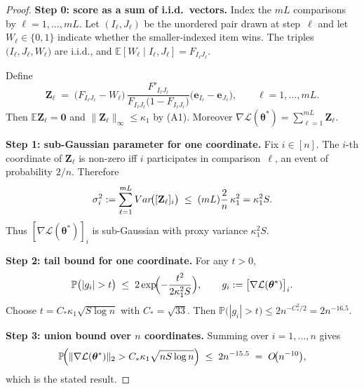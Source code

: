 \documentclass[10pt,a4paper]{amsart}
\def\E{\mathbb{E}}
\def\Var{{\rm Var}}
\def\bth{{\boldsymbol{\theta}}}
\newcommand{\Pro}{\mathbb{P}}
\begin{document}
\begin{proof}
	\textbf{Step 0: score as a sum of i.i.d.\ vectors.}
	Index the $mL$ comparisons by $\ell=1,\dots ,mL$.  Let
	\((I_\ell,J_\ell)\) be the unordered pair drawn at step~$\ell$ and let
	\(W_\ell\in\{0,1\}\) indicate whether the smaller-indexed item wins.
	The triples
	\(\bigl(I_\ell,J_\ell,W_\ell\bigr)\) are i.i.d., and
	\(\E[W_\ell\mid I_\ell,J_\ell]=F_{I_\ell J_\ell}\).
	
	Define
	\[
	\mathbf Z_\ell
	\;=\;
	\bigl(F_{I_\ell J_\ell}-W_\ell\bigr)\,
	\frac{F'_{I_\ell J_\ell}}{F_{I_\ell J_\ell}\bigl(1-F_{I_\ell J_\ell}\bigr)}
	\bigl(\mathbf e_{I_\ell}-\mathbf e_{J_\ell}\bigr),
	\qquad
	\ell=1,\dots,mL .
	\]
	Then \(\E\mathbf Z_\ell=\mathbf 0\) and
	\(\|\mathbf Z_\ell\|_{\infty}\le\kappa_{1}\) by (A1).  Moreover
	\(
	\nabla\mathcal L(\bth^{*})=\sum_{\ell=1}^{mL}\mathbf Z_\ell.
	\)
	
	\medskip
	\noindent
	\textbf{Step 1: sub-Gaussian parameter for one coordinate.}
	Fix \(i\in[n]\).  The $i$-th coordinate of \(\mathbf Z_\ell\) is non-zero
	iff \(i\) participates in comparison~$\ell$, an event of probability
	\(2/n\).  Therefore
	\[
	\sigma_i^{2}
	:=\sum_{\ell=1}^{mL}
	\Var\!\bigl([\mathbf Z_\ell]_{i}\bigr)
	\;\le\;
	(mL)\frac{2}{n}\,\kappa_{1}^{2}
	=\kappa_{1}^{2}S .
	\]
	Thus \([\nabla\mathcal L(\bth^{*})]_{i}\) is sub-Gaussian with
	proxy variance \(\kappa_{1}^{2}S\).
	
	\medskip
	\noindent
	\textbf{Step 2: tail bound for one coordinate.}
	For any \(t>0\),
	\[
	\Pro\bigl(|g_i|>t\bigr)
	\;\le\;
	2\exp\!\Bigl(
	-\frac{t^{2}}{2\kappa_{1}^{2}S}
	\Bigr),
	\qquad
	g_i:=\bigl[\nabla\mathcal L(\bth^{*})\bigr]_i .
	\]
	Choose \(t=C_{*}\kappa_{1}\sqrt{S\log n}\) with
	\(C_{*}=\sqrt{33}\).
	Then
	\(\Pro\bigl(|g_i|>t\bigr)\le 2n^{-C_{*}^{2}/2}=2n^{-16.5}\).
	
	\medskip
	\noindent
	\textbf{Step 3: union bound over $n$ coordinates.}
	Summing over \(i=1,\dots,n\) gives
	\[
	\Pro\!\Bigl(
	\|\nabla\mathcal L(\bth^{*})\|_{2}
	> C_{*}\kappa_{1}\sqrt{nS\log n}
	\Bigr)
	\;\le\;
	2n^{-15.5}
	\;=\;
	O\!\bigl(n^{-10}\bigr),
	\]
	which is the stated result.
\end{proof}
\end{document}
